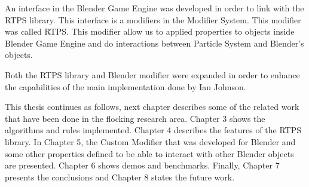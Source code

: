 An interface in the Blender Game Engine was developed in order to link with the RTPS library. This interface is a modifiers in the Modifier System. This modifier was called RTPS. This modifier allow us to applied properties to objects inside Blender Game Engine and do interactions between Particle System and Blender's objects.

Both the RTPS library and Blender modifier were expanded in order to enhance the capabilities of the main implementation done by Ian Johnson.


This thesis continues as follows, next chapter describes some of the related work that have been done in the flocking research area. Chapter 3 shows the algorithms and rules implemented. Chapter 4 describes the features of the RTPS library. In Chapter 5, the Custom Modifier that was developed for Blender and some other properties defined to be able to interact with other Blender objects are presented. Chapter 6 shows demos and benchmarks. Finally, Chapter 7 presents the conclusions and Chapter 8 states the future work. 
